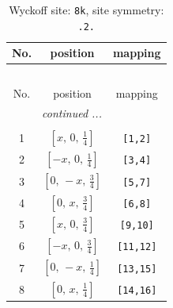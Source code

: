 \documentclass[fleqn,8pt]{jsarticle}
\begin{document}
\begin{longtable}{ccc}
\caption{Wyckoff site: {\tt 8k}, site symmetry: {\tt .2.}}
 \\
 \hline \hline
No. & position & mapping \\ \hline \endfirsthead

\multicolumn{2}{l}{\tablename\ \thetable{}} \\
 \hline \hline
No. & position & mapping \\ \hline \endhead

 \hline \hline
\multicolumn{2}{r}{\footnotesize\it continued ...} \\ \endfoot

 \hline \hline
\multicolumn{2}{r}{} \\ \endlastfoot

1 & $\left[ x,\, 0,\, \frac{1}{4} \right]$ & {\tt [1,2]} \\ \hline
2 & $\left[ - x,\, 0,\, \frac{1}{4} \right]$ & {\tt [3,4]} \\ \hline
3 & $\left[ 0,\, - x,\, \frac{3}{4} \right]$ & {\tt [5,7]} \\ \hline
4 & $\left[ 0,\, x,\, \frac{3}{4} \right]$ & {\tt [6,8]} \\ \hline
5 & $\left[ x,\, 0,\, \frac{3}{4} \right]$ & {\tt [9,10]} \\ \hline
6 & $\left[ - x,\, 0,\, \frac{3}{4} \right]$ & {\tt [11,12]} \\ \hline
7 & $\left[ 0,\, - x,\, \frac{1}{4} \right]$ & {\tt [13,15]} \\ \hline
8 & $\left[ 0,\, x,\, \frac{1}{4} \right]$ & {\tt [14,16]} \\
\end{longtable}
\renewcommand{\arraystretch}{1.2}
\end{document}
